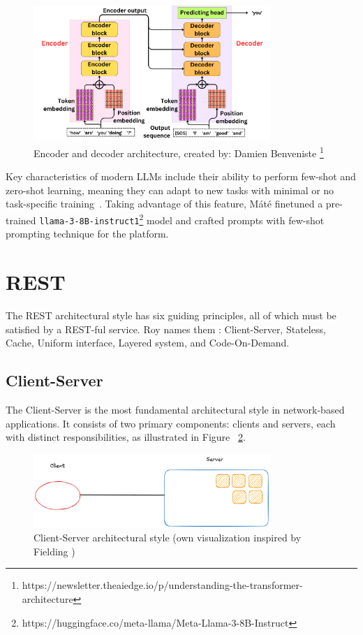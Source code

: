 \begin{figure}[H]
  \centering
  \includegraphics[width=0.8\textwidth, keepaspectratio]{figures/encoder-and-decoder.png}
  \caption{Encoder and decoder architecture, created by: Damien Benveniste \footnote{https://newsletter.theaiedge.io/p/understanding-the-transformer-architecture}}
  \label{fig:encoder-and-decoder}
\end{figure}

Key characteristics of modern LLMs include their ability to perform few-shot and zero-shot learning, meaning they can adapt to new tasks with minimal or no task-specific training~\cite{brown2020language}. Taking advantage of this feature, Máté finetuned a pre-trained \texttt{llama-3-8B-instruct1}\footnote{https://huggingface.co/meta-llama/Meta-Llama-3-8B-Instruct} model and crafted prompts with few-shot prompting technique for the platform.

\section{REST}

The REST architectural style has six guiding principles, all of which must be satisfied by a REST-ful service. Roy names them \cite[Chapter 5]{fielding2000}: Client-Server, Stateless, Cache, Uniform interface, Layered system, and Code-On-Demand.

\subsection{Client-Server}

The Client-Server is the most fundamental architectural style in network-based applications. It consists of two primary components: clients and servers, each with distinct responsibilities, as illustrated in Figure ~\ref{fig:client-server}.

\begin{figure}[!h]
\centering
\includegraphics[width=0.8\textwidth, keepaspectratio]{figures/client-server.png}
\caption{Client-Server architectural style (own visualization inspired by Fielding \cite{fielding2000})}
\label{fig:client-server}
\end{figure}

